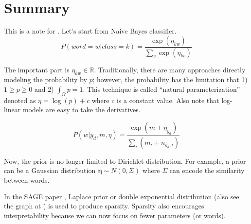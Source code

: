 \documentclass[11pt]{article}
\begin{document}
\section{Summary}

This is a note for \cite{eisenstein2011sparse}.
Let's start from Naive Bayes classifier.
$$
P(word = w|class = k) = \frac{\exp(\eta_{kw})}{\sum_v \exp(\eta_{kv})}
$$

The important part is $\eta_{kw} \in \mathbb{R}$. Traditionally, there are many approaches directly modeling the probability by $p$; however, the probability has the limitation that 1) $1 \geq p \geq 0$ and 2) $\int_{\Omega} p = 1$. This technique is called ``natural parameterization'' denoted as $\eta = \log(p) + c$ where $c$ is a constant value.
Also note that log-linear models are easy to take the derivatives.



$$
P(w|y_d, m, \eta) = \frac{\exp(m + \eta_{y_d})}{\sum_i (m_i + n_{y_d, i})}
$$

Now, the prior is no longer limited to Dirichlet distribution. For example, a prior can be a Gaussian distribution $\bm{\eta} \sim N(0, \Sigma)$ where $\Sigma$ can encode the similarity between words.

In the SAGE paper \cite{eisenstein2011sparse}, Laplace prior or double exponential distribution (also see the graph at \cite{place_prior}) is used to produce sparsity. 
Sparsity also encourages interpretability because we can now focus on fewer parameters (or words).



\end{document}
